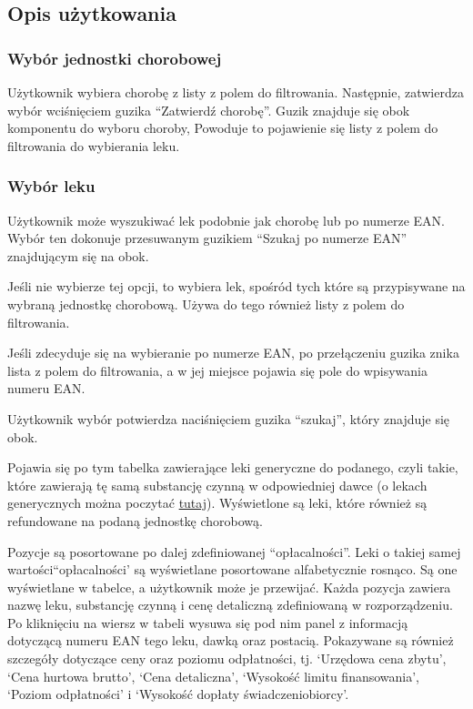 \documentclass{article}
\begin{document}
    \subsection{Opis użytkowania}
      \subsubsection{Wybór jednostki chorobowej}
      Użytkownik wybiera chorobę z listy z polem do filtrowania.
      Następnie, zatwierdza wybór wciśnięciem guzika ``Zatwierdź chorobę''.
      Guzik znajduje się obok komponentu do wyboru choroby,
      Powoduje to pojawienie się listy z polem do filtrowania do wybierania leku.

      \subsubsection{Wybór leku}
      Użytkownik może wyszukiwać lek podobnie jak chorobę lub po numerze EAN.
      Wybór ten dokonuje przesuwanym guzikiem ``Szukaj po numerze EAN'' znajdującym się na obok.

      Jeśli nie wybierze tej opcji, to wybiera lek, spośród tych które są przypisywane na wybraną jednostkę chorobową.
      Używa do tego również listy z polem do filtrowania.

      Jeśli zdecyduje się na wybieranie po numerze EAN, po przełączeniu guzika znika lista z polem do filtrowania,
      a w jej miejsce pojawia się pole do wpisywania numeru EAN.

      Użytkownik wybór potwierdza naciśnięciem guzika ``szukaj'', który znajduje się obok.

      Pojawia się po tym tabelka zawierające leki generyczne do podanego, czyli takie, które zawierają tę samą substancję czynną w odpowiedniej dawce
      (o lekach generycznych można poczytać \href{https://pl.wikipedia.org/wiki/Lek_generyczny}{tutaj}).
      Wyświetlone są leki, które również są refundowane na podaną jednostkę chorobową.

      Pozycje są posortowane po dalej zdefiniowanej ``opłacalności''.
      Leki o takiej samej wartości``opłacalności' są wyświetlane posortowane alfabetycznie rosnąco.
      Są one wyświetlane w tabelce, a użytkownik może je przewijać.
      Każda pozycja zawiera nazwę leku, substancję czynną i cenę detaliczną zdefiniowaną w rozporządzeniu.
      Po kliknięciu na wiersz w tabeli wysuwa się pod nim panel z informacją dotyczącą numeru EAN tego leku, dawką oraz postacią.
      Pokazywane są również szczegóły dotyczące ceny oraz poziomu odpłatności, tj.
      `Urzędowa cena zbytu',
      `Cena hurtowa brutto',
      `Cena detaliczna',
      `Wysokość limitu finansowania',
      `Poziom odpłatności' i
      `Wysokość dopłaty świadczeniobiorcy'.
\end{document}

